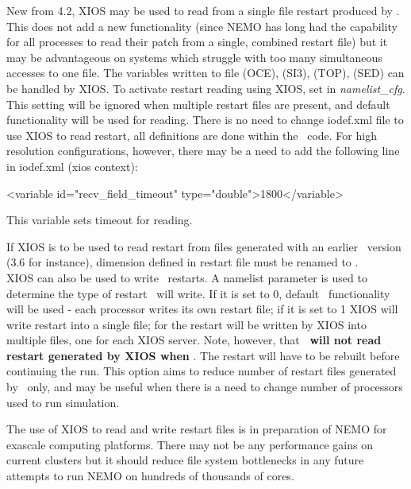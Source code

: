 \documentclass[../main/NEMO_manual]{subfiles}
\begin{document}
New from 4.2, XIOS may be used to read from a single file restart produced by \NEMO. 
This does not add a new functionality (since NEMO has long had the capability for all
processes to read their patch from a single, combined restart file) but it may be advantageous 
on systems which struggle with too many simultaneous accesses to one file.  The
variables written to file  (OCE),  (SI3), 
(TOP),  (SED) can be handled by XIOS.  To activate restart reading using
XIOS, set  in \textit{namelist\_cfg}. This
setting will be ignored when multiple restart files are present, and default \NEMO
functionality will be used for reading. There is no need to change iodef.xml file to use
XIOS to read restart, all definitions are done within the \NEMO\ code. For high resolution
configurations, however, there may be a need to add the following line in iodef.xml (xios
context):

\begin{xmllines}
<variable id="recv_field_timeout"        type="double">1800</variable>
\end{xmllines}

\noindent This variable sets timeout for reading.

\noindent If XIOS is to be used to read restart from files generated with an earlier \NEMO\ version (3.6 for instance),
dimension  defined in restart file must be renamed to .\\

XIOS can also be used to write \NEMO\ restarts. A namelist parameter
 is used to determine the type of restart \NEMO\ will write. If it
is set to 0, default \NEMO\ functionality will be used - each processor writes its own
restart file; if it is set to 1 XIOS will write restart into a single file; for
 the restart will be written by XIOS into multiple files, one
for each XIOS server.  Note, however, that \textbf{\NEMO\ will not read restart generated
by XIOS when }. The restart will have to be rebuilt before
continuing the run. This option aims to reduce number of restart files generated by \NEMO\
only, and may be useful when there is a need to change number of processors used to run
simulation.

The use of XIOS to read and write restart files is in preparation of NEMO for exascale
computing platforms. There may not be any performance gains on current clusters but it
should reduce file system bottlenecks in any future attempts to run NEMO on hundreds of
thousands of cores.
\end{document}
